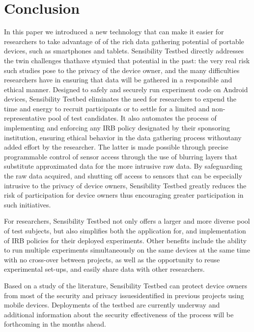 \section{Conclusion}\label{sec-conclude}

In this paper we introduced a new technology that can make it easier for 
researchers to take advantage of of the rich data gathering potential of 
portable devices, such as smartphones and tablets. Sensibility Testbed
directly addresses the twin challenges thathave stymied that potential in
the past: the very real risk such studies pose to the privacy
of the device owner, and the many difficulties researchers have in 
ensuring that data will be gathered in a responsible and ethical manner.
Designed to safely and securely run experiment code on Android devices,
Sensibility Testbed  eliminates the need for researchers to 
expend the time and energy to recruit participants or to settle
for a limited and non-representative pool of test candidates. It also automates
the process of implementing and enforcing any IRB policy designated by
their sponsoring institution, ensuring ethical behavior in the data 
gathering process withoutany added effort by the researcher. The latter is made possible
through precise programmable control of sensor access through the use of blurring
layers that substitute approximated data for the more intrusive raw data. By 
safeguarding the raw data acquired, and shutting off access to sensors that can
be especially intrusive to the privacy of device owners, Sensibility Testbed
greatly reduces the risk of participation for device owners thus encouraging greater
participation in such initiatives.

For researchers, Sensibility Testbed not only offers a larger and more diverse pool
of test subjects, but also simplifies both the application for, and implementation
of IRB policies for their deployed experiments. Other benefits include the ability to
run multiple experiments simultaneously on the same devices
at the same time with no cross-over between projects, as well as the opportunity to 
reuse experimental set-ups, and easily share data with other researchers.
 
Based on a study of the literature, Sensibility Testbed can protect device owners
from most of the security and privacy issuesidentified in previous projects
using mobile devices. Deployments of the testbed are currently underway and
additional information about the security effectiveness of the process will
be forthcoming in the months ahead.